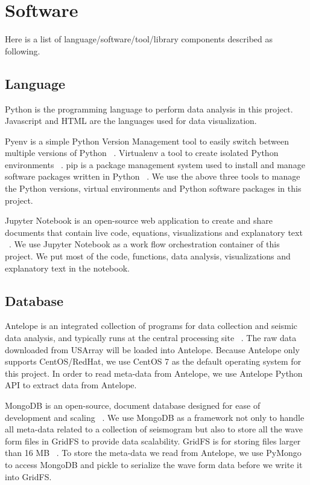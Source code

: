 \documentclass[9pt,twocolumn,twoside]{../../styles/osajnl}
\begin{document}
\section{Software}

Here is a list of language/software/tool/library components described as following.

\subsection{Language}

Python is the programming language to perform data analysis in this project. Javascript and HTML are the languages used for data visualization.

Pyenv is a simple Python Version Management tool to easily switch between multiple versions of Python ~\cite{www-pyenv}. Virtualenv a tool to create isolated Python environments ~\cite{www-virtenv}. pip is a package management system used to install and manage software packages written in Python ~\cite{www-wikipip}. We use the above three tools to manage the Python versions, virtual environments and Python software packages in this project.

Jupyter Notebook is an open-source web application to create and share documents that contain live code, equations, visualizations and explanatory text ~\cite{www-jupyter}. We use Jupyter Notebook as a work flow orchestration container of this project. We put most of the code, functions, data analysis, visualizations and explanatory text in the notebook.

\subsection{Database}

Antelope is an integrated collection of programs for data collection and seismic data analysis, and typically runs at the central processing site ~\cite{www-antelope}. The raw data downloaded from USArray will be loaded into Antelope. Because Antelope only supports CentOS/RedHat, we use CentOS 7 as the default operating system for this project. In order to read meta-data from Antelope, we use Antelope Python API to extract data from Antelope.

MongoDB is an open-source, document database designed for ease of development and scaling ~\cite{www-mongoman}. We use MongoDB as a framework not only to handle all meta-data related to a collection of seismogram but also to store all the wave form files in GridFS to provide data scalability. GridFS is for storing files larger than 16 MB ~\cite{www-gridfs}. To store the meta-data we read from Antelope, we use PyMongo~\cite{www-pymongo} to access MongoDB and pickle to serialize the wave form data before we write it into GridFS.
\end{document}
